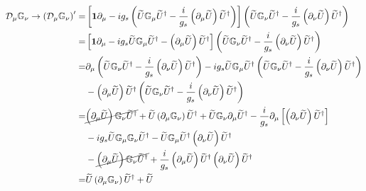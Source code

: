 \begin{align}
\label{eq:tdcg}
 \mathcal{D}_{\mu} \mathbb{G}_{\nu}\to   \left(   \mathcal{D}_{\mu} \mathbb{G}_{\nu} \right)' =&
\left[\boldsymbol{1}\partial_{\mu}-i g_s\left(\widetilde{U} \mathbb{G}_\mu \widetilde{U}^{\dagger}-\frac{i}{g_s}\left(\partial_\mu \widetilde{U}\right)\widetilde{U}^\dagger  \right)   \right] \left(\widetilde{U} \mathbb{G}_\nu \widetilde{U}^{\dagger}-\frac{i}{g_s}\left(\partial_\nu \widetilde{U}\right)\widetilde{U}^\dagger  \right) \nonumber\\
=&
\left[\boldsymbol{1}\partial_{\mu}-i g_s\widetilde{U} \mathbb{G}_\mu \widetilde{U}^{\dagger}-\left(\partial_\mu \widetilde{U}\right)\widetilde{U}^\dagger   \right] \left(\widetilde{U} \mathbb{G}_\nu \widetilde{U}^{\dagger}-\frac{i}{g_s}\left(\partial_\nu \widetilde{U}\right)\widetilde{U}^\dagger  \right) \nonumber\\
=&
\partial_{\mu} \left(\widetilde{U} \mathbb{G}_\nu \widetilde{U}^{\dagger}-\frac{i}{g_s}\left(\partial_\nu \widetilde{U}\right)\widetilde{U}^\dagger  \right)
-i g_s\widetilde{U} \mathbb{G}_\mu \widetilde{U}^{\dagger}\left(\widetilde{U} \mathbb{G}_\nu \widetilde{U}^{\dagger}-\frac{i}{g_s}\left(\partial_\nu \widetilde{U}\right)\widetilde{U}^\dagger  \right)
\nonumber\\
&-\left(\partial_\mu \widetilde{U}\right)\widetilde{U}^\dagger\left(\widetilde{U} \mathbb{G}_\nu \widetilde{U}^{\dagger}-\frac{i}{g_s}\left(\partial_\nu \widetilde{U}\right)\widetilde{U}^\dagger  \right) \nonumber\\
  =& \cancel{\left(\partial_{\mu} \widetilde{U} \right) \mathbb{G}_\nu \widetilde{U}^{\dagger}} + \widetilde{U}
  \left( \partial_{\mu}\mathbb{G}_\nu \right) \widetilde{U}^{\dagger} + \widetilde{U}
  \mathbb{G}_{\nu} \partial_{\mu} \widetilde{U}^{\dagger} -\frac{i}{g_s}\partial_{\mu}
  \left[ \left( \partial_{\nu}\widetilde{U} \right)\widetilde{U}^{\dagger} \right]
  \nonumber\\
  &-i g_s \widetilde{U} \mathbb{G}_{\mu}\mathbb{G}_{\nu}\widetilde{U}^{\dagger}- \widetilde{U}\mathbb{G}_{\mu} \widetilde{U}^{\dagger} \left( \partial_{\nu} \widetilde{U}\right)\widetilde{U}^{\dagger} \nonumber\\
  &-\cancel{\left( \partial_{\mu}\widetilde{U} \right)\mathbb{G}_{\nu} \widetilde{U}^{\dagger}}
  +\frac{i}{g_s} \left( \partial_{\mu}\widetilde{U} \right) \widetilde{U}^{\dagger} \left( \partial_{\nu}\widetilde{U} \right) \widetilde{U}^{\dagger} \nonumber\\
  =& \widetilde{U} \left( \partial_{\mu}\mathbb{G}_\nu \right) \widetilde{U}^{\dagger} + \widetilde{U}

\end{align}
